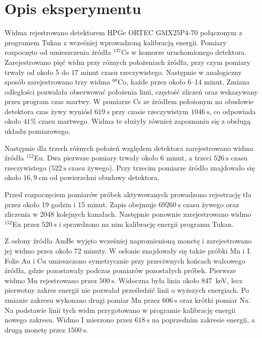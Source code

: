\documentclass[twocolumn,a4paper,10pt]{article}
\begin{document}
\section{Opis eksperymentu}
Widma rejestrowano detektorem HPGe ORTEC GMX25P4-70 połączonym
z programem Tukan z wcześniej wprowadzoną kalibracją energii. Pomiary rozpoczęto od umieszczenia źródła $^{137}$Cs w komorze uruchomionego detektora. Zarejestrowano pięć widm przy różnych położeniach
źródła, przy czym pomiary trwały od około 5 do 17 minut czasu
rzeczywistego. Następnie w analogiczny sposób zarejestrowano
trzy widma $^{60}$Co, każde przez około 6--14 minut.
Zmiana odległości pozwalała obserwować położenia linii,
częstość zliczeń oraz wskazywany przez program czas martwy.
W pomiarze Cs ze źródłem położonym na obudowie detektora
czas żywy wyniósł $619~\mathrm{s}$ przy czasie rzeczywistym
$1046~\mathrm{s}$, co odpowiada około $41\%$ czasu martwego.
Widma te służyły również zapoznaniu się z obsługą układu
pomiarowego.

Następnie dla trzech różnych położeń względem detektora zarejestrowano widma źródła $^{152}$Eu.
Dwa pierwsze pomiary trwały około 6 minut, a trzeci
$526~\mathrm{s}$ czasu rzeczywistego
($522~\mathrm{s}$ czasu żywego). Przy trzecim pomiarze
źródło znajdowało się około $16{,}9~\mathrm{cm}$
od powierzchni obudowy detektora.

Przed rozpoczęciem pomiarów próbek aktywowanych
prowadzono rejestrację tła przez około 19 godzin
i 15 minut. Zapis obejmuje $69260~\mathrm{s}$
czasu żywego oraz zliczenia w 2048 kolejnych kanałach.
Następnie ponownie zarejestrowano widmo $^{152}$Eu
przez $520~\mathrm{s}$ i sprawdzono na nim kalibrację
energii programu Tukan.

Z osłony źródła AmBe wyjęto wcześniej napromienioną
monetę i zarejestrowano jej widmo przez około 72 minuty.
W osłonie znajdowały się także próbki Mn i I.
Folie Au i Cu umieszczono symetrycznie przy przeciwnych
końcach walcowego źródła, gdzie pozostawały podczas
pomiarów pozostałych próbek. Pierwsze widmo Mn
rejestrowano przez $500~\mathrm{s}$. Widoczna była
linia około 847~keV, lecz pierwotny zakres energii
nie pozwalał prześledzić linii o wyższych energiach.
Po zmianie zakresu wykonano drugi pomiar Mn przez
$606~\mathrm{s}$ oraz krótki pomiar Na. Na podstawie
linii tych widm przygotowano w programie kalibrację
energii nowego zakresu. Widmo I mierzono
przez $618~\mathrm{s}$ na poprzednim zakresie energii,
a drugą monetę przez $1500~\mathrm{s}$.
\end{document}
